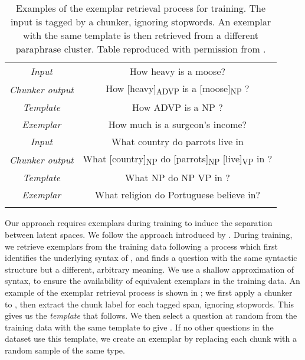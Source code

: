 \documentclass[11pt]{article}
\begin{document}
\begin{table}[t!]
    \small
    \centering
    \begin{tabular}{@{}c@{~}|@{~}c@{}}
    
    \hhline{==}
        \textit{Input} & How heavy is a moose? \\
\textit{Chunker output} & How [heavy]\textsubscript{ADVP} is a [moose]\textsubscript{NP} ? \\
\textit{Template} & How ADVP is a NP ? \\
\textit{Exemplar} & How much is a surgeon's income? \\
    \hhline{==}
        \textit{Input} & What country do parrots live in \\
\textit{Chunker output} & What [country]\textsubscript{NP} do  [parrots]\textsubscript{NP} [live]\textsubscript{VP} in ? \\
\textit{Template} & What NP do NP VP in ? \\
\textit{Exemplar} & What religion do Portuguese believe in? \\
     \hhline{==}
    \end{tabular}
\caption{Examples of the exemplar retrieval process for training. The input is tagged by a chunker, ignoring stopwords. An exemplar with the same template is then retrieved from a different paraphrase cluster. Table reproduced with permission from \citet{hosking-lapata-2021-factorising}.}
    \label{tab:templateexample}
\end{table}

Our approach requires exemplars during training
to induce the separation between latent spaces. We follow the approach introduced by \citet{hosking-lapata-2021-factorising}. During training, we retrieve exemplars  from the
training data following a process which first identifies the
underlying syntax of , and finds a question with the same
syntactic structure but a different, arbitrary meaning. We use a
shallow approximation of syntax, to ensure the availability of
equivalent exemplars in the training data. An example of the exemplar
retrieval process is shown in ; we first
apply a chunker \citep[FlairNLP, ][]{akbik-etal-2018-contextual} to
, then extract the chunk label for each tagged span,
ignoring stopwords. This gives us the \textit{template} that
 follows. We then select a question at random from the
training data with the same template to give . If no
other questions in the dataset use this template, we create an exemplar by replacing each chunk with a random sample of the same type.
\end{document}
